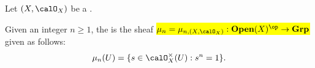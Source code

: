\begin{definition} \label{definition:sheaf_of_roots_of_unity_on_a_ringed_space}
    Let $(X, \calO_X)$ be a .

    Given an integer $n \geq 1$, the  is the sheaf \hl{$\mu_n = \mu_{n,(X,\calO_X)} : \mathbf{Open}(X)^{\op} \to \mathbf{Grp}$} given as follows:
    $$\mu_{n}(U) = \{s \in \calO_X^\times(U): s^n = 1\}.$$
\end{definition}